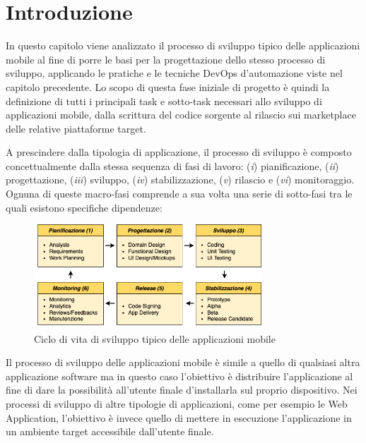 
\section{Introduzione}
In questo capitolo viene analizzato il processo di sviluppo tipico delle applicazioni mobile al fine di porre le basi per la progettazione dello stesso processo di sviluppo,
applicando le pratiche e le tecniche DevOps d'automazione viste nel capitolo precedente. 
Lo scopo di questa fase iniziale di progetto è quindi la definizione di tutti i principali task e sotto-task necessari allo sviluppo di applicazioni mobile, 
dalla scrittura del codice sorgente al rilascio sui marketplace delle relative piattaforme target. 

A prescindere dalla tipologia di applicazione, il processo di sviluppo è composto concettualmente dalla stessa sequenza di fasi di lavoro: 
(\textit{i}) pianificazione, 
(\textit{ii}) progettazione, 
(\textit{iii}) sviluppo, 
(\textit{iv}) stabilizzazione, 
(\textit{v}) rilascio e (\textit{vi}) monitoraggio. 
Ognuna di queste macro-fasi comprende a sua volta una serie di sotto-fasi tra le quali esistono specifiche dipendenze:

\begin{figure}[H]
    \centering
    \includegraphics[width=0.76\textwidth]{img/sdlc.png}
    \caption{Ciclo di vita di sviluppo tipico delle applicazioni mobile}
    \label{sdlc-app-mobile-fig}
\end{figure}

Il processo di sviluppo delle applicazioni mobile è simile a quello di qualsiasi altra applicazione software ma in questo caso l'obiettivo è distribuire l'applicazione al fine di dare la possibilità all'utente finale d'installarla sul proprio dispositivo. 
Nei processi di sviluppo di altre tipologie di applicazioni, 
come per esempio le Web Application, 
l'obiettivo è invece quello di mettere in esecuzione l'applicazione in un ambiente target accessibile dall'utente finale.

